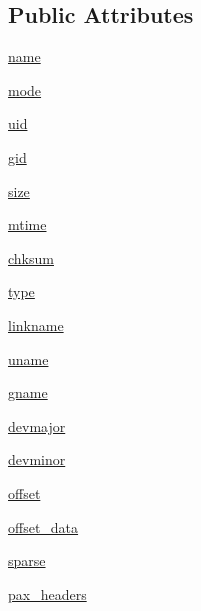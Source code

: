 \subsection*{Public Attributes}
\begin{DoxyCompactItemize}
\item 
\hyperlink{classpip_1_1__vendor_1_1distlib_1_1__backport_1_1tarfile_1_1TarInfo_a2a4171afa2c64ccfe9351f3bb4bb95be}{name}
\item 
\hyperlink{classpip_1_1__vendor_1_1distlib_1_1__backport_1_1tarfile_1_1TarInfo_a2616c95eca58b2741579cdd5c4a61831}{mode}
\item 
\hyperlink{classpip_1_1__vendor_1_1distlib_1_1__backport_1_1tarfile_1_1TarInfo_ac4011b84e945ede0312d99e7d5fa3c91}{uid}
\item 
\hyperlink{classpip_1_1__vendor_1_1distlib_1_1__backport_1_1tarfile_1_1TarInfo_a4aa4d92e134978cc13248fe3490d48a8}{gid}
\item 
\hyperlink{classpip_1_1__vendor_1_1distlib_1_1__backport_1_1tarfile_1_1TarInfo_ae36d2d3fbd71a7426bf0c8ccf33b300a}{size}
\item 
\hyperlink{classpip_1_1__vendor_1_1distlib_1_1__backport_1_1tarfile_1_1TarInfo_a3e5d0b2074a1aa6df8eeb058b888ce48}{mtime}
\item 
\hyperlink{classpip_1_1__vendor_1_1distlib_1_1__backport_1_1tarfile_1_1TarInfo_a6d679709320fdd0a6ea76d830d48f761}{chksum}
\item 
\hyperlink{classpip_1_1__vendor_1_1distlib_1_1__backport_1_1tarfile_1_1TarInfo_aa46c3707deae0ce6c9e15554b0e9af23}{type}
\item 
\hyperlink{classpip_1_1__vendor_1_1distlib_1_1__backport_1_1tarfile_1_1TarInfo_a94be566810cdaa03fe2d46a61a7987aa}{linkname}
\item 
\hyperlink{classpip_1_1__vendor_1_1distlib_1_1__backport_1_1tarfile_1_1TarInfo_ab55f74925408e366804e43c52c36af40}{uname}
\item 
\hyperlink{classpip_1_1__vendor_1_1distlib_1_1__backport_1_1tarfile_1_1TarInfo_a870f6dfbbc50563e506919d45a178ad3}{gname}
\item 
\hyperlink{classpip_1_1__vendor_1_1distlib_1_1__backport_1_1tarfile_1_1TarInfo_ae20188df02394f082894a6a4c0c1861c}{devmajor}
\item 
\hyperlink{classpip_1_1__vendor_1_1distlib_1_1__backport_1_1tarfile_1_1TarInfo_a620dd0dbd6c29c544b300d6296b9b0e6}{devminor}
\item 
\hyperlink{classpip_1_1__vendor_1_1distlib_1_1__backport_1_1tarfile_1_1TarInfo_ae7c5afa0a3b16b33e9c2d907faddc402}{offset}
\item 
\hyperlink{classpip_1_1__vendor_1_1distlib_1_1__backport_1_1tarfile_1_1TarInfo_a4a4eb07a603aba82306f014cf96897c7}{offset\+\_\+data}
\item 
\hyperlink{classpip_1_1__vendor_1_1distlib_1_1__backport_1_1tarfile_1_1TarInfo_af749bae932f0ccf6c9c87e2a1ad8da59}{sparse}
\item 
\hyperlink{classpip_1_1__vendor_1_1distlib_1_1__backport_1_1tarfile_1_1TarInfo_aabcf4d12a0f476f8031092ccf75920d4}{pax\+\_\+headers}
\end{DoxyCompactItemize}
